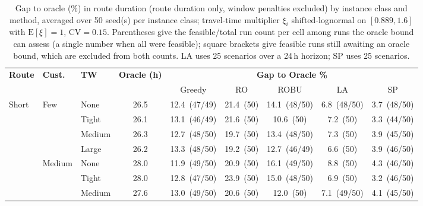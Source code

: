 \begin{table}[htbp]
\centering
\caption{Gap to oracle (\%) in route duration (route duration only, window penalties excluded) by instance class and method, averaged over 50 seed(s) per instance class; travel-time multiplier $\xi_i$ shifted-lognormal on $[0.889, 1.6]$ with $\mathrm{E}[\xi]=1$, $\mathrm{CV} = 0.15$.  Parentheses give the feasible/total run count per cell among runs the oracle bound can assess (a single number when all were feasible); square brackets give feasible runs still awaiting an oracle bound, which are excluded from both counts.  LA uses 25 scenarios over a 24\,h horizon; SP uses 25 scenarios.}
\label{tab:gap-nopen}
\begin{tabular}{lll c ccccc}
\toprule
\multirow{2}{*}{\textbf{\small Route}} & \multirow{2}{*}{\textbf{\small Cust.}} & \multirow{2}{*}{\textbf{\small TW}} & \multirow{2}{*}{\textbf{Oracle (h)}} &
\multicolumn{5}{c}{\textbf{Gap to Oracle \%}} \\
\cmidrule(lr){5-9}
 & & & & Greedy & RO & ROBU & LA & SP \\
\midrule
\multirow{12}{*}{\small Short} & \multirow{4}{*}{\small Few} & {\small None} & 26.5 & 12.4~{\scriptsize(47/49)} & 21.4~{\scriptsize(50)} & 14.1~{\scriptsize(48/50)} & 6.8~{\scriptsize(48/50)} & 3.7~{\scriptsize(48/50)} \\
 &  & {\small Tight} & 26.1 & 13.1~{\scriptsize(46/49)} & 21.6~{\scriptsize(50)} & 10.6~{\scriptsize(50)} & 7.2~{\scriptsize(50)} & 3.3~{\scriptsize(44/50)} \\
 &  & {\small Medium} & 26.3 & 12.7~{\scriptsize(48/50)} & 19.7~{\scriptsize(50)} & 13.4~{\scriptsize(48/50)} & 7.3~{\scriptsize(50)} & 3.9~{\scriptsize(45/50)} \\
 &  & {\small Large} & 26.2 & 13.3~{\scriptsize(48/50)} & 19.2~{\scriptsize(50)} & 12.7~{\scriptsize(46/49)} & 6.6~{\scriptsize(50)} & 3.9~{\scriptsize(46/50)} \\
 & \multirow{4}{*}{\small Medium} & {\small None} & 28.0 & 11.9~{\scriptsize(49/50)} & 20.9~{\scriptsize(50)} & 16.1~{\scriptsize(49/50)} & 8.8~{\scriptsize(50)} & 4.3~{\scriptsize(46/50)} \\
 &  & {\small Tight} & 28.0 & 12.8~{\scriptsize(47/50)} & 23.9~{\scriptsize(50)} & 15.0~{\scriptsize(48/50)} & 6.9~{\scriptsize(50)} & 3.2~{\scriptsize(46/50)} \\
 &  & {\small Medium} & 27.6 & 13.0~{\scriptsize(49/50)} & 20.6~{\scriptsize(50)} & 12.0~{\scriptsize(50)} & 7.1~{\scriptsize(49/50)} & 4.1~{\scriptsize(45/50)} \\

\end{tabular}
\end{table}
